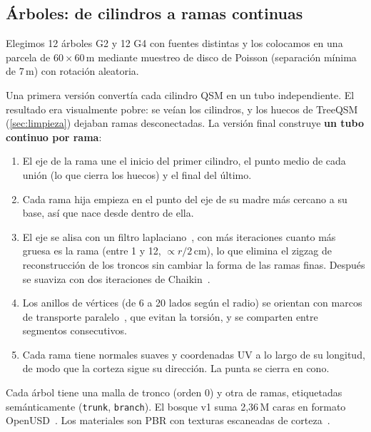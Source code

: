 \documentclass[11pt,a4paper]{article}
\begin{document}
\subsection{Árboles: de cilindros a ramas continuas}
Elegimos 12 árboles G2 y 12 G4 con fuentes distintas y los colocamos en una parcela de $60\times60$\,m mediante muestreo de disco de Poisson (separación mínima de 7\,m) con rotación aleatoria.

Una primera versión convertía cada cilindro QSM en un tubo independiente. El resultado era visualmente pobre: se veían los cilindros, y los huecos de TreeQSM (\cref{sec:limpieza}) dejaban ramas desconectadas. La versión final construye \textbf{un tubo continuo por rama}:
\begin{enumerate}
  \item El eje de la rama une el inicio del primer cilindro, el punto medio de cada unión (lo que cierra los huecos) y el final del último.
  \item Cada rama hija empieza en el punto del eje de su madre más cercano a su base, así que nace desde dentro de ella.
  \item El eje se alisa con un filtro laplaciano~\cite{taubin1995signal}, con más iteraciones cuanto más gruesa es la rama (entre 1 y 12, $\propto r/2$\,cm), lo que elimina el zigzag de reconstrucción de los troncos sin cambiar la forma de las ramas finas. Después se suaviza con dos iteraciones de Chaikin~\cite{chaikin1974curve}.
  \item Los anillos de vértices (de 6 a 20 lados según el radio) se orientan con marcos de transporte paralelo~\cite{bishop1975frame}, que evitan la torsión, y se comparten entre segmentos consecutivos.
  \item Cada rama tiene normales suaves y coordenadas UV a lo largo de su longitud, de modo que la corteza sigue su dirección. La punta se cierra en cono.
\end{enumerate}
Cada árbol tiene una malla de tronco (orden 0) y otra de ramas, etiquetadas semánticamente (\texttt{trunk}, \texttt{branch}). El bosque v1 suma 2,36\,M caras en formato OpenUSD~\cite{pixarusd}. Los materiales son PBR con texturas escaneadas de corteza~\cite{polyhaven}.
\end{document}
